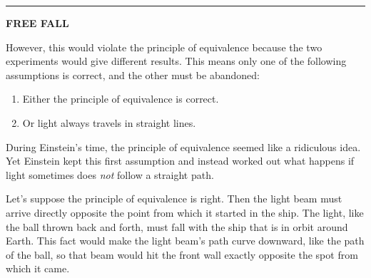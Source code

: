 \documentclass{article}
\numberwithin{equation}{section}
\numberwithin{figure}{section}
\begin{document}
\hrule

\vspace{1em}

\begin{center}
\textbf{FREE FALL}
\vspace{1ex}

\end{center}


However, this would violate the principle of equivalence because the two experiments would give different results. This means only one of the following assumptions is correct, and the other must be abandoned:

\begin{enumerate}
\setlength\itemsep{-1ex}
    \item Either the principle of equivalence is correct.
    \item Or light always travels in straight lines.
\end{enumerate}

During Einstein's time, the principle of equivalence seemed like a ridiculous idea. Yet Einstein kept this first assumption and instead worked out what happens if light sometimes does \textit{not} follow a straight path.
\vspace{1em}

Let's suppose the principle of equivalence is right. Then the light beam must arrive directly opposite the point from which it started in the ship. The light, like the ball thrown back and forth, must fall with the ship that is in orbit around Earth. This fact would make the light beam's path curve downward, like the path of the ball, so that beam would hit the front wall exactly opposite the spot from which it came.
\vspace{1em}
\end{document}
